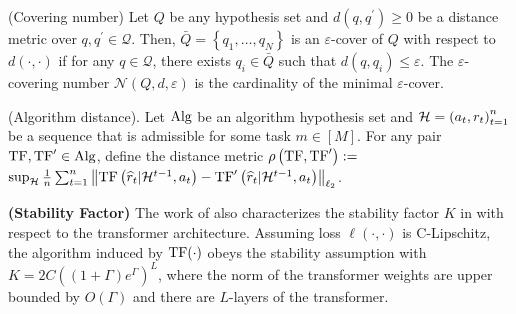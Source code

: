 \begin{definition}(Covering number)\label{def:covering-number}
Let $Q$ be any hypothesis set and $d\left(q, q^{\prime}\right) \geq 0$ be a distance metric over $q, q^{\prime} \in \mathcal{Q}$. Then, $\bar{Q}=\left\{q_1, \ldots, q_N\right\}$ is an $\varepsilon$-cover of $Q$ with respect to $d(\cdot, \cdot)$ if for any $q \in \mathcal{Q}$, there exists $q_i \in \bar{Q}$ such that $d\left(q, q_i\right) \leq \varepsilon$. The $\varepsilon$-covering number $\mathcal{N}(Q, d, \varepsilon)$ is the cardinality of the minimal $\varepsilon$-cover.
\end{definition}


\begin{definition}(Algorithm distance). 
\label{def:alg-dist}
Let $\mathrm{Alg}$ be an algorithm hypothesis set and $\mathcal{H}=\left(a_t, r_t\right)_{t=1}^n$ be a sequence that is admissible for some task $m \in[M]$. For any pair $\mathrm{TF}, \mathrm{TF}^{\prime} \in \mathrm{Alg}$, define the distance metric $\rho\left(\mathrm{TF}, \mathrm{TF}^{\prime}\right):=$ $\sup_{\mathcal{H}} \frac{1}{n} \sum_{t=1}^n\left\|\mathrm{TF}\left(\widehat{r}_t|\mathcal{H}^{t-1}, a_t\right)-\mathrm{TF}^{\prime}\left(\widehat{r}_t|\mathcal{H}^{t-1}, a_t\right)\right\|_{\ell_2}$.
\end{definition}

\begin{remark}\textbf{(Stability Factor)} 
\label{remark:stability}
The work of \citet{li2023transformers} also characterizes the stability factor $K$ in  with respect to the transformer architecture. Assuming loss $\ell(\cdot, \cdot)$ is C-Lipschitz, the algorithm induced by $\mathrm{TF}(\cdot)$ obeys the stability assumption with $K=2 C\left((1+\Gamma) e^{\Gamma}\right)^L$, where the norm of the transformer weights are upper bounded by $O(\Gamma)$ and there are $L$-layers of the transformer.
\end{remark}

